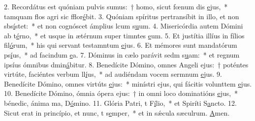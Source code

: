 2. Recordátus est quóniam pulvis sumus:~† homo, sicut fœnum dis \uline{e}jus,~* tamquam flos agri sic fflor\uline{é}bit.
3. Quóniam spíritus pertransíbit in illo, et non sbs\uline{í}stet:~* et non cognóscet ámplius lcum s\uline{u}um.
4. Misericórdia autem Dómini ab t\uline{é}rno,~* et usque in ætérnum super timntes \uline{e}um.
5. Et justítia illíus in fílios fil\uline{ó}rum,~* his qui servant testamntum \uline{e}jus.
6. Et mémores sunt mandatórum ps\uline{í}us,~* ad facindum \uline{e}a.
7. Dóminus in cælo parávit sedm s\uline{u}am:~* et regnum ipsíus ómnibus dmin\uline{á}bitur.
8. Benedícite Dómino, omnes Angeli ejus:~† poténtes virtúte, faciéntes verbum ll\uline{í}us,~* ad audiéndam vocem sermnum \uline{e}jus.
9. Benedícite Dómino, omnes virtúts \uline{e}jus:~* minístri ejus, qui fácitis volunttem \uline{e}jus.
10. Benedícite Dómino, ómnia ópera ejus:~† in omni loco dominatións \uline{e}jus,~* bénedic, ánima ma, D\uline{ó}mino.
11. Glória Patri, t F\uline{í}lio,~* et Spiríti S\uline{a}ncto.
12. Sicut erat in princípio, et nunc, t s\uline{e}mper,~* et in sǽcula sæculrum. \uline{A}men.
